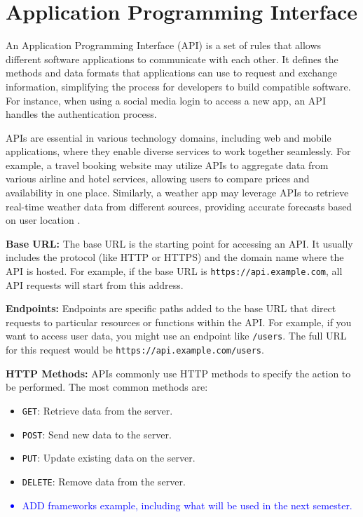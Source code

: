 \section{Application Programming Interface}

An Application Programming Interface (API) is a set of rules that allows different software applications to communicate with each other. It defines the methods and data formats that applications can use to request and exchange information, simplifying the process for developers to build compatible software. For instance, when using a social media login to access a new app, an API handles the authentication process.

APIs are essential in various technology domains, including web and mobile applications, where they enable diverse services to work together seamlessly. For example, a travel booking website may utilize APIs to aggregate data from various airline and hotel services, allowing users to compare prices and availability in one place. Similarly, a weather app may leverage APIs to retrieve real-time weather data from different sources, providing accurate forecasts based on user location \cite{ibm2024}.


\textbf{Base URL:} The base URL is the starting point for accessing an API. It usually includes the protocol (like HTTP or HTTPS) and the domain name where the API is hosted. For example, if the base URL is \texttt{https://api.example.com}, all API requests will start from this address.

\textbf{Endpoints:} Endpoints are specific paths added to the base URL that direct requests to particular resources or functions within the API. For example, if you want to access user data, you might use an endpoint like \texttt{/users}. The full URL for this request would be \texttt{https://api.example.com/users}.

\textbf{HTTP Methods:} APIs commonly use HTTP methods to specify the action to be performed. The most common methods are:
\begin{itemize}
	\item \texttt{GET}: Retrieve data from the server.
	\item \texttt{POST}: Send new data to the server.
	\item \texttt{PUT}: Update existing data on the server.
	\item \texttt{DELETE}: Remove data from the server.
\end{itemize}
 
 \textcolor{blue}{
 	\begin{itemize}
 		\item ADD frameworks example, including what will be used in the next semester.
 \end{itemize}}

